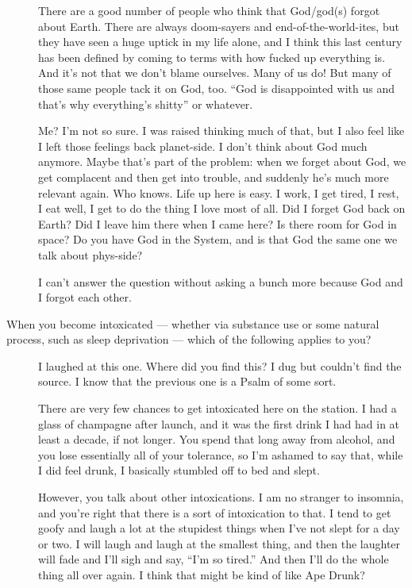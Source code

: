 \begin{description}
There are a good number of people who think that God/god(s) forgot about Earth. There are always doom-sayers and end-of-the-world-ites, but they have seen a huge uptick in my life alone, and I think this last century has been defined by coming to terms with how fucked up everything is. And it's not that we don't blame ourselves. Many of us do! But many of those same people tack it on God, too. ``God is disappointed with us and that's why everything's shitty'' or whatever.

Me? I'm not so sure. I was raised thinking much of that, but I also feel like I left those feelings back planet-side. I don't think about God much anymore. Maybe that's part of the problem: when we forget about God, we get complacent and then get into trouble, and suddenly he's much more relevant again. Who knows. Life up here is easy. I work, I get tired, I rest, I eat well, I get to do the thing I love most of all. Did I forget God back on Earth? Did I leave him there when I came here? Is there room for God in space? Do you have God in the System, and is that God the same one we talk about phys-side?

I can't answer the question without asking a bunch more because God and I forgot each other.
\item[When you become intoxicated — whether via substance use or some natural process, such as sleep deprivation — which of the following applies to you?]
I laughed at this one. Where did you find this? I dug but couldn't find the source. I know that the previous one is a Psalm of some sort.

There are very few chances to get intoxicated here on the station. I had a glass of champagne after launch, and it was the first drink I had had in at least a decade, if not longer. You spend that long away from alcohol, and you lose essentially all of your tolerance, so I'm ashamed to say that, while I did feel drunk, I basically stumbled off to bed and slept.

However, you talk about other intoxications. I am no stranger to insomnia, and you're right that there is a sort of intoxication to that. I tend to get goofy and laugh a lot at the stupidest things when I've not slept for a day or two. I will laugh and laugh at the smallest thing, and then the laughter will fade and I'll sigh and say, ``I'm so tired.'' And then I'll do the whole thing all over again. I think that might be kind of like Ape Drunk?


\end{description}
